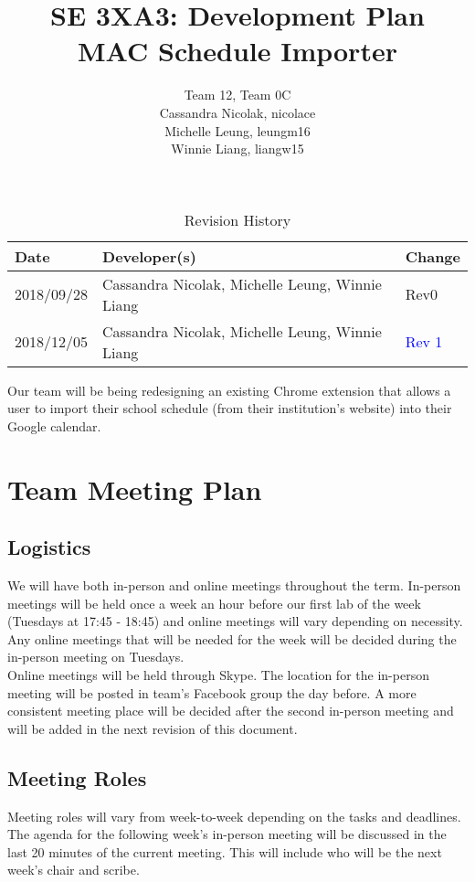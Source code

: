 \documentclass{article}
\title{SE 3XA3: Development Plan\\MAC Schedule Importer}
\author{Team 12, Team 0C
		\\ Cassandra Nicolak, nicolace
		\\ Michelle Leung, leungm16
		\\ Winnie Liang, liangw15
}
\date{}
\begin{document}
\begin{table}[hp]
\caption{Revision History} \label{TblRevisionHistory}
\begin{tabularx}{\textwidth}{llX}
\toprule
\textbf{Date} & \textbf{Developer(s)} & \textbf{Change}\\
\midrule
2018/09/28 & Cassandra Nicolak, Michelle Leung, Winnie Liang & Rev0\\
\color{blue}
2018/12/05 & \color{blue} Cassandra Nicolak, Michelle Leung, Winnie Liang & \textcolor{blue}{Rev 1}\\
\bottomrule
\end{tabularx}
\end{table}

\newpage

\maketitle

Our team will be being redesigning an existing Chrome extension that allows a user to import their school schedule (from their institution's website) into their Google calendar.


\section{Team Meeting Plan}
\subsection{Logistics}
\hspace{5mm}We will have both in-person and online meetings throughout the term. In-person meetings will be held once a week an hour before our first lab of the week (Tuesdays at 17:45 - 18:45) and online meetings will vary depending on necessity. Any online meetings that will be needed for the week will be decided during the in-person meeting on Tuesdays. \\

Online meetings will be held through Skype. The location for the in-person meeting will be posted in team's Facebook group the day before. A more consistent meeting place will be decided after the second in-person meeting and will be added in the next revision of this document.

\subsection{Meeting Roles}
\hspace{5mm}Meeting roles will vary from week-to-week depending on the tasks and deadlines. The agenda for the following week's in-person meeting will be discussed in the last 20 minutes of the current meeting. This will include who will be the next week's chair and scribe.\\
\end{document}
